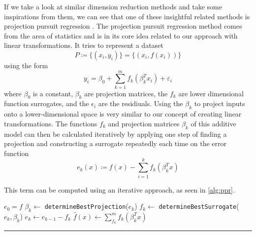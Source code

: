 \documentclass[
  a4paper,  %
  twoside,  %
  bibliography=totoc,
  headsepline,
  cleardoublepage=empty,
  parskip=half,
  draft=false
]{scrbook}
\newcommand{\delimit}{{\color{charcoal}\noindent\rule{\textwidth}{1pt}}}
\begin{document}
If we take a look at similar dimension reduction methods and take some inspirations from them, we can see that one of these insightful related methods is projection pursuit regression \cite{huber1985projection}.
The projection pursuit regression method comes from the area of statistics and is in its core idea related to our approach with linear transformations.
It tries to represent a dataset
\begin{equation}
P \coloneqq \{(x_i, y_i)\}=\{(x_i, f(x_i))\}
\end{equation}
using the form
\begin{equation}
y_i=\beta_0 + \sum_{k=1}^m f_k(\beta_k^T x_i) + \varepsilon_i
\label{eq:ppr}
\end{equation}
where $\beta_0$ is a constant, $\beta_k$ are projection matrices, the $f_k$ are lower dimensional function surrogates, and the $\epsilon_i$ are the residiuals.
Using the $\beta_k$ to project inputs onto a lower-dimensional space is very similar to our concept of creating linear transformations.
The functions $f_k$ and projection matrices $\beta_k$ of this additive model can then be calculated iteratively by applying one step of finding a projection and constructing a surrogate repeatedly each time on the error function
\begin{equation}
e_k(x) \coloneqq f(x) - \sum_{i=1}^k f_k(\beta_k^T x)
\end{equation}

This term can be computed using an iterative approach, as seen in \cref{alg:ppr}.

\begin{mdframed}[style=algstyle,frametitle={\textbf{function} \texttt{projectionPursuitRegression}{$(f, k_{\text{max}})$}}]
\normalsize
\vspace{5.5mm}
\begin{algorithmic}[1]

    \State $e_0 = f$
    	\State $\beta_k \gets$ \texttt{determineBestProjection}($e_k$)
    	\State $f_k \gets$ \texttt{determineBestSurrogate}($e_k, \beta_k$)
    	\State $e_k \gets e_{k - 1} - f_k$
    \EndFor
    \State $\hat{f}(x) \gets \sum_{f_k}^m f_k(\beta_k^T x)$
    \State {}
\end{algorithmic}

\vspace{-1.5mm}
\delimit

	\label{alg:ppr}
\end{mdframed}
\end{document}
